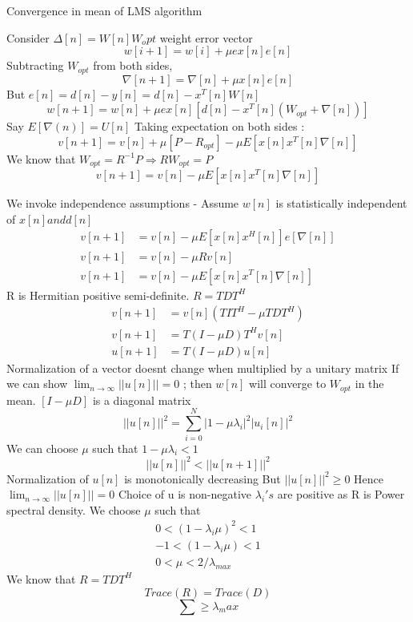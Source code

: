 Convergence in mean of LMS algorithm

Consider $\Delta[n]= W[n]W_opt$ weight error vector
$$  w[i+1] = w[i] + \mu ex[n]e[n] $$
Subtracting $W_{opt}$ from both sides,
$$  \nabla[n+1] = \nabla[n] + \mu x[n]e[n] $$
But $ e[n]=d[n]-y[n] = d[n]-x^T[n]W[n]$
$$  w[n+1] = w[n] + \mu ex[n][d[n]-x^T[n](W_{opt}+\nabla[n])]$$
Say $E[\nabla(n)]=U[n]$
Taking expectation on both sides :
$$  v[n+1] = v[n] + \mu [P -R_{opt}]-\mu E[x[n]x^T[n]\nabla[n]]$$
We know that $W_{opt}=R^{-1}P \Rightarrow RW_{opt}=P$
$$  v[n+1] = v[n] -\mu E[x[n]x^T[n]\nabla[n]]$$

We invoke independence assumptions - 
Assume $w[n]$ is statistically independent of $x[n] and d[n]$
\begin{align*}  v[n+1] &= v[n] -\mu E[x[n]x^H[n]]e[\nabla[n]] \\
  v[n+1] &= v[n] -\mu Rv[n] \\
  v[n+1] &= v[n] -\mu E[x[n]x^T[n]\nabla[n]] \end{align*}
R is Hermitian positive semi-definite.
$R=TDT^H$
\begin{align*}  v[n+1] &= v[n](TIT^{H} - \mu TDT^{H})
\\  v[n+1] &= T(I-\mu D)T^Hv[n]
\\  u[n+1] &= T(I-\mu D)u[n]\end{align*}
Normalization of a vector doesnt change when multiplied by a unitary matrix
If we can show $\lim_{n\to\infty}||u[n]||=0$ ; then $w[n]$ will converge to $W_{opt}$ in the mean.
$[I-\mu D]$ is a diagonal matrix
$$||u[n]||^2=\sum_{i=0}^{N}|1-\mu\lambda_i|^2|u_i[n]|^2 $$
We can choose $\mu$ such that $1-\mu\lambda_i < 1$
$$||u[n]||^2 < ||u[n+1]||^2$$
Normalization of $u[n]$ is monotonically decreasing 
But $||u[n]||^2\geq 0$
Hence $\lim_{n\to\infty}||u[n]||=0$
Choice of u is non-negative
$\lambda_i's$ are positive as R is Power spectral density.
We choose $\mu$ such that
\begin{align*} 0<(1-\lambda_i \mu)^2<1 
\\ -1<(1-\lambda_i\mu)<1
\\ 0<\mu<2/\lambda_{max}\end{align*}
We know that $R=TDT^H$
$$Trace(R)=Trace(D)$$
$$\sum \geq \lambda_max$$





